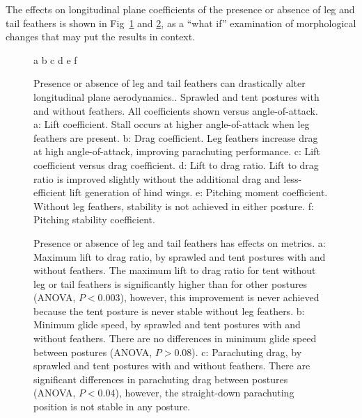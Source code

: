 The effects on longitudinal plane coefficients of the presence or absence of leg and tail feathers is shown in Fig~\ref{fig:feathers1} and \ref{fig:feathersEK}, as a ``what if'' examination of morphological changes that may put the results in context.  
\begin{figure}
a %
b %
c %
d %
e %
f %
\caption{{ Presence or absence of leg and tail feathers can drastically alter longitudinal plane aerodynamics.}.  Sprawled and tent postures with and without feathers. All coefficients shown versus angle-of-attack. a: Lift coefficient.  Stall occurs at higher angle-of-attack when leg feathers are present. b: Drag coefficient.  Leg feathers increase drag at high angle-of-attack, improving parachuting performance. c: Lift coefficient versus drag coefficient. d: Lift to drag ratio. Lift to drag ratio is improved slightly without the additional drag and less-efficient lift generation of hind wings. e: Pitching moment coefficient. Without leg feathers, stability is not achieved in either posture. f: Pitching stability coefficient.}
\label{fig:feathers1}
\end{figure}
\begin{figure}
\caption{{ Presence or absence of leg and tail feathers has effects on \citep{Emerson:1990b} metrics}.  a:  Maximum lift to drag ratio, by sprawled and tent postures with and without feathers.  The maximum lift to drag ratio for tent without leg or tail feathers is significantly higher than for other postures (ANOVA, $P < 0.003$), however, this improvement is never achieved because the tent posture is never stable without leg feathers. b:  Minimum glide speed, by sprawled and tent postures with and without feathers.  There are no differences in minimum glide speed between postures (ANOVA, $P > 0.08$). c:  Parachuting drag, by sprawled and tent postures with and without feathers.  There are significant differences in parachuting drag between postures (ANOVA, $P < 0.04$), however, the straight-down parachuting position is not stable in any posture. }
\label{fig:feathersEK}
\end{figure}


